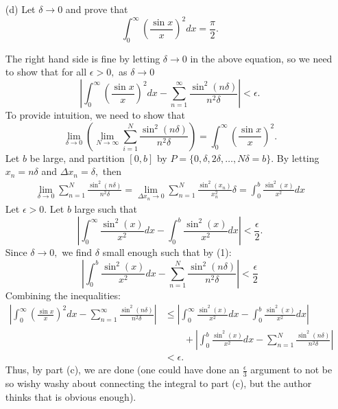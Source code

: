 \documentclass[11pt]{article}
\begin{document}
\begin{itemize}
    \item[(d)] Let \( \delta \to 0 \) and prove that
    \[
    \int_0^{\infty} \left( \frac{\sin x}{x} \right)^2 dx = \frac{\pi}{2}.
    \]
    \begin{solution}
    The right hand side is fine by letting $\delta \to 0$ in the above equation, so we need to show that for all $\epsilon>0,$ as $\delta \to 0$
        \[\left|\int_0^\infty \left(\frac{\sin x}{x}\right)^2dx - \sum_{n=1}^\infty \frac{\sin^2(n\delta)}{n^2\delta}\right|< \epsilon.\]
        To provide intuition, we need to show that 
        \[\lim_{\delta \to 0}\left(\lim_{N\to \infty}\sum_{i=1}^N \frac{\sin^2(n\delta)}{n^2\delta}\right) = \int_0^\infty \left(\frac{\sin x}{x}\right)^2.\]
Let $b$ be large, and partition $[0,b]$ by $P = \{0, \delta, 2\delta, \dots, N\delta = b\}.$ By letting $x_n = n\delta$ and $\Delta x_n = \delta,$ then 
\begin{align}
\lim_{\delta \to 0}\sum_{n=1}^N \frac{\sin^2(n\delta)}{n^2 \delta} = \lim_{\Delta x_n \to 0} \sum_{n =1}^{N}\frac{\sin^2(x_n)}{x_n^2}\delta = \int_0^b \frac{\sin^2 (x)}{x^2}dx    
\end{align}
 Let $\epsilon>0.$ Let $b$ large such that 
\[\left|\int_0^\infty \frac{\sin^2 (x)}{x^2}dx - \int_0^b \frac{\sin^2 (x)}{x^2}dx\right|< \frac{\epsilon}{2}.\] Since $\delta \to 0,$ we find $\delta$ small enough such that by (1):
\[\left|\int_0^b\frac{\sin^2 (x)}{x^2}dx - \sum_{n=1}^N \frac{\sin^2(n\delta)}{n^2 \delta} \right| < \frac{\epsilon}{2}\] Combining the inequalities:
\begin{align*}
    \left|\int_0^\infty \left(\frac{\sin x}{x}\right)^2dx - \sum_{n=1}^\infty \frac{\sin^2(n\delta)}{n^2\delta}\right| &\leq \left| \int_0^\infty \frac{\sin^2 (x)}{x^2}dx - \int_0^b \frac{\sin^2 (x)}{x^2}dx\right| \\
    &\qquad + \left|\int_0^b\frac{\sin^2 (x)}{x^2}dx - \sum_{n=1}^N \frac{\sin^2(n\delta)}{n^2 \delta} \right|\\ &< \epsilon.
\end{align*}
Thus, by part (c), we are done (one could have done an $\frac{\epsilon}{3}$ argument to not be so wishy washy about connecting the integral to part (c), but the author thinks that is obvious enough).
        
    \end{solution}
    \begin{problem}
        

\end{problem}
\end{itemize}
\end{document}
